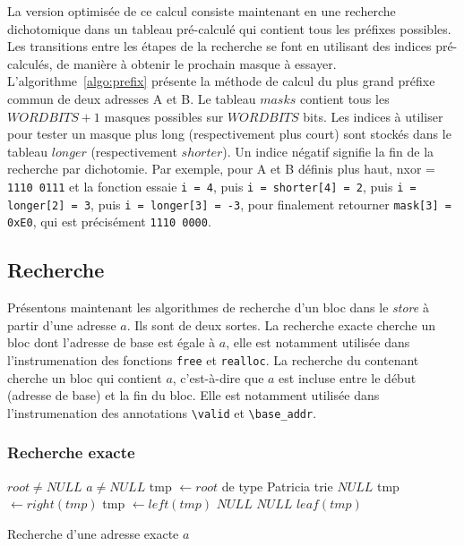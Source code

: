 La version optimisée de ce calcul consiste maintenant en une recherche
dichotomique dans un tableau pré-calculé qui contient tous les préfixes
possibles.
Les transitions entre les étapes de la recherche se font en utilisant des
indices pré-calculés, de manière à obtenir le prochain masque à essayer.
L'algorithme~\ref{algo:prefix} présente la méthode de calcul du plus grand
préfixe commun de deux adresses A et B.
Le tableau $masks$ contient tous les $WORDBITS+1$ masques possibles sur
$WORDBITS$ bits.
Les indices à utiliser pour tester un masque plus long (respectivement plus
court) sont stockés dans le tableau $longer$ (respectivement $shorter$).
Un indice négatif signifie la fin de la recherche par dichotomie.
Par exemple, pour A et B définis plus haut, nxor = \texttt{1110\,0111}
et la fonction essaie \lstinline'i = 4', puis \lstinline'i = shorter[4] = 2',
puis \lstinline'i = longer[2] = 3', puis \lstinline'i = longer[3] = -3', pour
finalement retourner \lstinline'mask[3] = 0xE0', qui
est précisément \texttt{1110\,0000}.


\subsection{Recherche}

Présentons maintenant les algorithmes de recherche d'un bloc dans le
\textit{store} à partir d'une adresse $a$.
Ils sont de deux sortes.
La recherche exacte cherche un bloc dont l'adresse de base est égale à $a$, elle
est notamment utilisée dans l'instrumenation des fonctions \lstinline'free' et
\lstinline'realloc'.
La recherche du contenant cherche un bloc qui contient $a$, c'est-à-dire que
$a$ est incluse entre le début (adresse de base) et la fin du bloc.
Elle est notamment utilisée dans l'instrumenation des annotations
\lstinline'\valid' et \lstinline'\base_addr'.

\subsubsection*{Recherche exacte}

\begin{algorithm}
\begin{algorithmic}
\Require $root \neq NULL$
\Require $a \neq NULL$
\State tmp $\gets root$ de type Patricia trie
    \Return $NULL$
  \EndIf
    \State tmp $\gets right(tmp)$
    \State tmp $\gets left(tmp)$
  \Else
    \Return $NULL$
  \EndIf
\EndWhile
{}
  \Return $NULL$
\Else
  \Return $leaf(tmp)$
\EndIf
\end{algorithmic}
\caption{Recherche d'une adresse exacte $a$
  \label{algo:get-exact}}
\end{algorithm}


